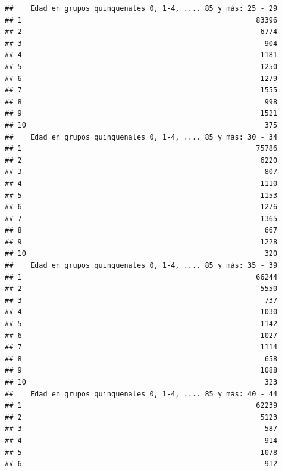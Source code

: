 \documentclass[11pt,]{article}
\begin{document}
\begin{verbatim}
##    Edad en grupos quinquenales 0, 1-4, .... 85 y más: 25 - 29
## 1                                                       83396
## 2                                                        6774
## 3                                                         904
## 4                                                        1181
## 5                                                        1250
## 6                                                        1279
## 7                                                        1555
## 8                                                         998
## 9                                                        1521
## 10                                                        375
##    Edad en grupos quinquenales 0, 1-4, .... 85 y más: 30 - 34
## 1                                                       75786
## 2                                                        6220
## 3                                                         807
## 4                                                        1110
## 5                                                        1153
## 6                                                        1276
## 7                                                        1365
## 8                                                         667
## 9                                                        1228
## 10                                                        320
##    Edad en grupos quinquenales 0, 1-4, .... 85 y más: 35 - 39
## 1                                                       66244
## 2                                                        5550
## 3                                                         737
## 4                                                        1030
## 5                                                        1142
## 6                                                        1027
## 7                                                        1114
## 8                                                         658
## 9                                                        1088
## 10                                                        323
##    Edad en grupos quinquenales 0, 1-4, .... 85 y más: 40 - 44
## 1                                                       62239
## 2                                                        5123
## 3                                                         587
## 4                                                         914
## 5                                                        1078
## 6                                                         912

\end{verbatim}
\end{document}
